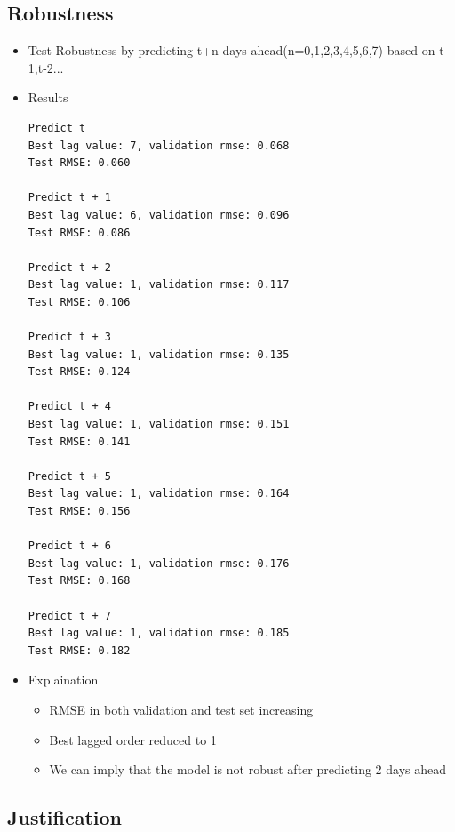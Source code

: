 \documentclass[11pt]{article}
\providecommand{\tightlist}{%
      \setlength{\itemsep}{0pt}\setlength{\parskip}{0pt}}
\begin{document}
\subsection{Robustness}\label{robustness}

\begin{itemize}
\item
  Test Robustness by predicting t+n days ahead(n=0,1,2,3,4,5,6,7) based
  on t-1,t-2...
\item
  Results

\begin{verbatim}
Predict t
Best lag value: 7, validation rmse: 0.068
Test RMSE: 0.060

Predict t + 1
Best lag value: 6, validation rmse: 0.096
Test RMSE: 0.086

Predict t + 2
Best lag value: 1, validation rmse: 0.117
Test RMSE: 0.106

Predict t + 3
Best lag value: 1, validation rmse: 0.135
Test RMSE: 0.124

Predict t + 4
Best lag value: 1, validation rmse: 0.151
Test RMSE: 0.141

Predict t + 5
Best lag value: 1, validation rmse: 0.164
Test RMSE: 0.156

Predict t + 6
Best lag value: 1, validation rmse: 0.176
Test RMSE: 0.168

Predict t + 7
Best lag value: 1, validation rmse: 0.185
Test RMSE: 0.182
\end{verbatim}
\item
  Explaination

  \begin{itemize}
  \tightlist
  \item
    RMSE in both validation and test set increasing
  \item
    Best lagged order reduced to 1
  \item
    We can imply that the model is not robust after predicting 2 days
    ahead
  \end{itemize}
\end{itemize}

\subsection{Justification}\label{justification}
\end{document}
